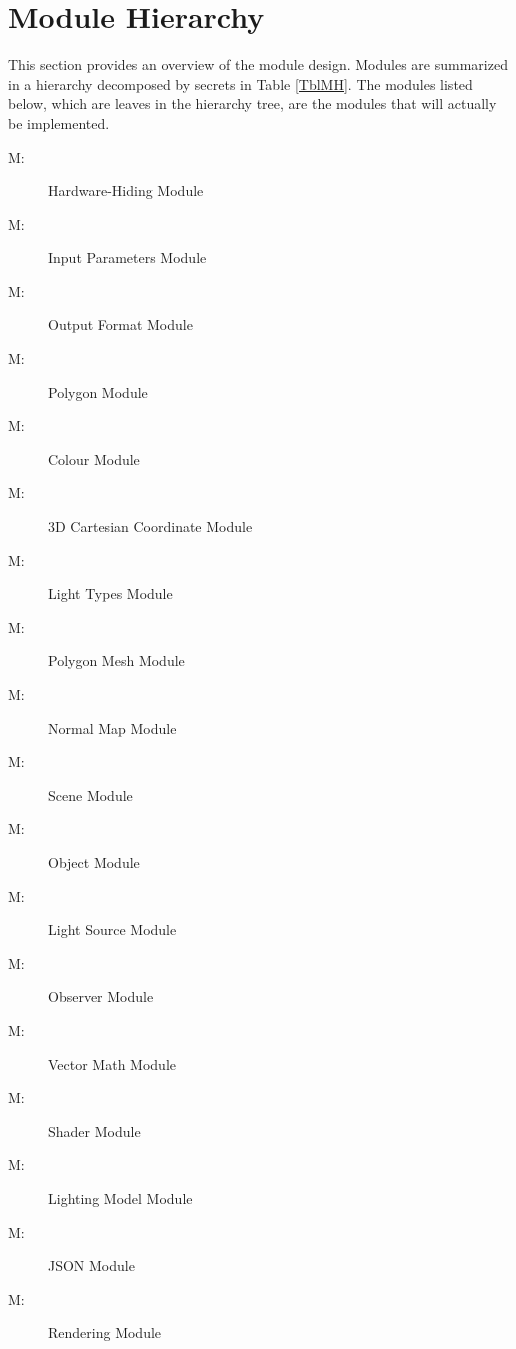 \documentclass[12pt, titlepage]{article}
\newcounter{mnum}
\newcommand{\mthemnum}{M\themnum}
\begin{document}
\section{Module Hierarchy} \label{SecMH}

This section provides an overview of the module design. Modules are summarized
in a hierarchy decomposed by secrets in Table \ref{TblMH}. The modules listed
below, which are leaves in the hierarchy tree, are the modules that will
actually be implemented.

\begin{description}
\item [ \mthemnum \label{mHH}:] Hardware-Hiding Module
\item [ \mthemnum \label{mInputs}:] Input Parameters Module
\item [ \mthemnum \label{mOutputs}:] Output Format Module
\item [ \mthemnum \label{mPolygon}:] Polygon Module
\item [ \mthemnum \label{mColour}:] Colour Module
\item [ \mthemnum \label{mPoints}:] 3D Cartesian 
Coordinate 
Module
\item [ \mthemnum \label{mTypes}:] Light Types 
Module
\item [ \mthemnum \label{mMesh}:] Polygon Mesh Module
\item [ \mthemnum \label{mNormals}:] Normal Map Module
\item [ \mthemnum \label{mScene}:] Scene Module
\item [ \mthemnum \label{mObjects}:] Object Module
\item [ \mthemnum \label{mLights}:] Light Source Module
\item [ \mthemnum \label{mObsv}:] Observer Module
\item [ \mthemnum \label{mVectors}:] Vector Math Module
\item [ \mthemnum \label{mShader}:] Shader Module
\item [ \mthemnum \label{mLightModel}:] Lighting Model 
Module
\item [ \mthemnum \label{mJSON}:] JSON Module
\item [ \mthemnum \label{mUnity}:] Rendering Module
\end{description}
\end{document}
